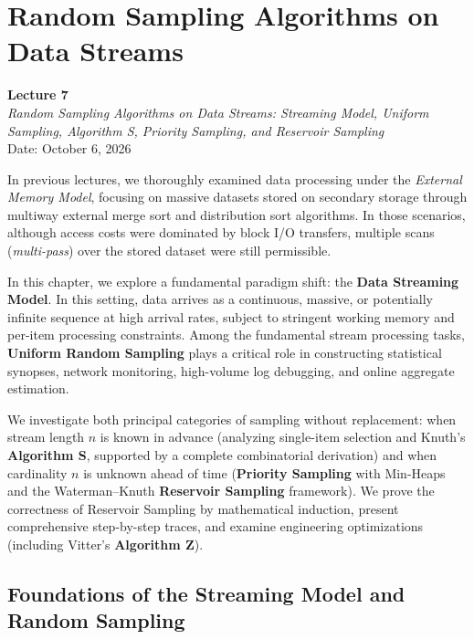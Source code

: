 \chapter{Random Sampling Algorithms on Data Streams}
\label{chap:random-sampling-data-streams}

\begin{center}
  \textbf{Lecture 7}\\
  \emph{Random Sampling Algorithms on Data Streams: Streaming Model, Uniform Sampling, Algorithm S, Priority Sampling, and Reservoir Sampling}\\[0.5em]
  Date: October 6, 2026
\end{center}

In previous lectures, we thoroughly examined data processing under the \textit{External Memory Model}, focusing on massive datasets stored on secondary storage through multiway external merge sort and distribution sort algorithms. In those scenarios, although access costs were dominated by block I/O transfers, multiple scans (\textit{multi-pass}) over the stored dataset were still permissible.

In this chapter, we explore a fundamental paradigm shift: the \textbf{Data Streaming Model}. In this setting, data arrives as a continuous, massive, or potentially infinite sequence at high arrival rates, subject to stringent working memory and per-item processing constraints. Among the fundamental stream processing tasks, \textbf{Uniform Random Sampling} plays a critical role in constructing statistical synopses, network monitoring, high-volume log debugging, and online aggregate estimation.

We investigate both principal categories of sampling without replacement: when stream length $n$ is known in advance (analyzing single-item selection and Knuth's \textbf{Algorithm S}, supported by a complete combinatorial derivation) and when cardinality $n$ is unknown ahead of time (\textbf{Priority Sampling} with Min-Heaps and the Waterman--Knuth \textbf{Reservoir Sampling} framework). We prove the correctness of Reservoir Sampling by mathematical induction, present comprehensive step-by-step traces, and examine engineering optimizations (including Vitter's \textbf{Algorithm Z}).

\FloatBarrier
\section{Foundations of the Streaming Model and Random Sampling}
\label{sec:streaming-model-foundations}


